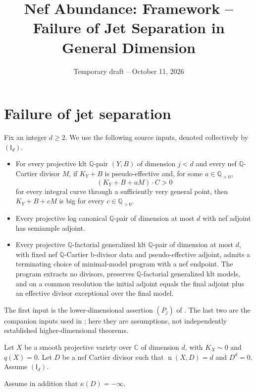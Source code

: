 \documentclass[12pt,a4paper,psamsfonts]{amsart}
\title{Nef Abundance: Framework -- Failure of Jet Separation in General Dimension}
\date{Temporary draft -- October 11, 2026}
\theoremstyle{definition}
\theoremstyle{plain}
\newcommand{\Q}{\mathbb Q}
\newcommand{\C}{\mathbb C}
\newcommand{\nef}{\operatorname{n}}
\begin{document}
\maketitle

\section{Failure of jet separation}

Fix an integer $d\ge2$. We use the following source inputs,
denoted collectively by $(\mathsf I_d)$.
\begin{itemize}
\setlength{\itemsep}{2pt}
\setlength{\parsep}{0pt}
\item For every projective klt $\Q$-pair $(Y,B)$ of dimension
$j<d$ and every nef $\mathbb{Q}$-Cartier divisor $M$, if $K_Y+B$ is
pseudo-effective and, for some $a\in\Q_{>0}$,
\[
 (K_Y+B+aM)\cdot C>0
\]
for every integral curve through a sufficiently very general point,
then $K_Y+B+cM$ is big for every $c\in\Q_{>0}$.
\item Every projective log canonical $\Q$-pair of dimension at most
$d$ with nef adjoint has semiample adjoint.
\item Every projective $\Q$-factorial generalized klt $\Q$-pair of
dimension at most $d$, with fixed nef $\mathbb{Q}$-Cartier b-divisor
data and pseudo-effective adjoint, admits a terminating choice of
minimal-model program with a nef endpoint. The program extracts no
divisors, preserves $\Q$-factorial generalized klt models, and on a
common resolution the initial adjoint equals the final adjoint plus
an effective divisor exceptional over the final model.
\end{itemize}
The first input is the lower-dimensional assertion $(P_j)$ of
\cite[Section~3.1]{NS}. The last two are the companion inputs
used in \cite[Section~2]{NS}; here they are assumptions, not
independently established higher-dimensional theorems.

Let $X$ be a smooth projective variety over $\C$ of dimension $d$,
with $K_X\sim0$ and $q(X)=0$. Let $D$ be a nef Cartier divisor
such that $\nef(X,D)=d$ and $D^d=0$. Assume $(\mathsf I_d)$.

Assume in addition that $\kappa(D)=-\infty$.
\end{document}

